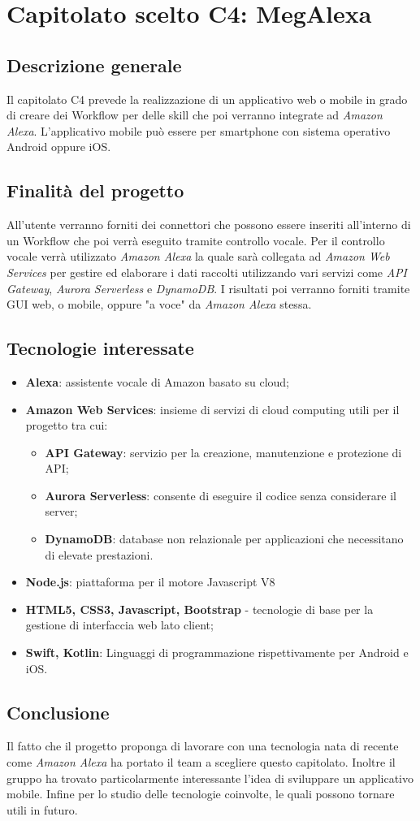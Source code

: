 \chapter{Capitolato scelto C4: MegAlexa}
\section{Descrizione generale}
Il capitolato C4 prevede la realizzazione di un applicativo web o mobile in grado di creare dei Workflow per delle skill che poi verranno integrate ad \emph{Amazon Alexa}.
L'applicativo mobile può essere per smartphone con sistema operativo Android oppure iOS.
\section{Finalit\`a del progetto}
All'utente verranno forniti dei connettori che possono essere inseriti all'interno di un Workflow che poi verrà eseguito tramite controllo vocale.  
Per il controllo vocale verrà utilizzato \emph{Amazon Alexa} la quale sarà collegata ad \emph{Amazon Web Services} per gestire ed elaborare i dati raccolti utilizzando vari servizi come \emph{API Gateway}, \emph{Aurora Serverless} e \emph{DynamoDB}.
I risultati poi verranno forniti tramite GUI web, o mobile, oppure "a voce" da \emph{Amazon Alexa} stessa.
\section{Tecnologie interessate}
\begin{itemize}
	\item \textbf{Alexa}: assistente vocale di Amazon basato su cloud;
	\item \textbf{Amazon Web Services}: insieme di servizi di cloud computing utili per il progetto tra cui:
	\begin{itemize}
	\item \textbf{API Gateway}: servizio per la creazione, manutenzione e protezione di API;
	\item \textbf{Aurora Serverless}: consente di eseguire il codice senza considerare il server;
	\item \textbf{DynamoDB}: database non relazionale per applicazioni che necessitano di elevate prestazioni.
	\end{itemize}
	\item \textbf{Node.js}: piattaforma per il motore Javascript V8
	\item \textbf{HTML5, CSS3, Javascript, Bootstrap} - tecnologie di base per la gestione di interfaccia web lato client;
	\item \textbf{Swift, Kotlin}: Linguaggi di programmazione rispettivamente per Android e iOS.
\end{itemize}
\section{Conclusione}
Il fatto che il progetto proponga di lavorare con una tecnologia nata di recente come \emph{Amazon Alexa} ha portato il team a scegliere questo capitolato. Inoltre il gruppo ha trovato particolarmente interessante l'idea di sviluppare un applicativo mobile. Infine per lo studio delle tecnologie coinvolte, le quali possono tornare utili in futuro.